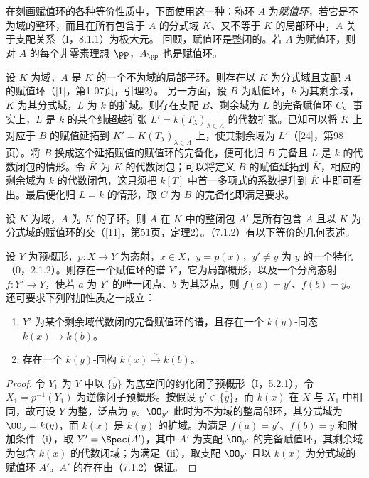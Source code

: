在刻画赋值环的各种等价性质中，下面使用这一种：称环 $A$ 为\emph{赋值环}，若它是不为域的整环，而且在所有包含于 $A$ 的分式域 $K$、又不等于 $K$ 的局部环中，$A$ 关于支配关系（I，8.1.1）为极大元。
回顾，赋值环是整闭的。若 $A$ 为赋值环，则对 $A$ 的每个非零素理想 $\pp$，$A_\pp$ 也是赋值环。

设 $K$ 为域，$A$ 是 $K$ 的一个不为域的局部子环。则存在以 $K$ 为分式域且支配 $A$ 的赋值环（[1]，第1-07页，引理2）。
另一方面，设 $B$ 为赋值环，$k$ 为其剩余域，$K$ 为其分式域，$L$ 为 $k$ 的扩域。则存在支配 $B$、剩余域为 $L$ 的完备赋值环 $C$。事实上，$L$ 是 $k$ 的某个纯超越扩张 $L'=k(T_\lambda)_{\lambda\in\Lambda}$ 的代数扩张。已知可以将 $K$ 上对应于 $B$ 的赋值延拓到 $K'=K(T_\lambda)_{\lambda\in\Lambda}$ 上，使其剩余域为 $L'$（[24]，第98页）。将 $B$ 换成这个延拓赋值的赋值环的完备化，便可化归 $B$ 完备且 $L$ 是 $k$ 的代数闭包的情形。令 $\overline K$ 为 $K$ 的代数闭包；可以将定义 $B$ 的赋值延拓到 $\overline K$，相应的剩余域为 $k$ 的代数闭包，这只须把 $k[T]$ 中首一多项式的系数提升到 $\overline K$ 中即可看出。最后便化归 $L=k$ 的情形，取 $C$ 为 $B$ 的完备化即满足要求。

设 $K$ 为域，$A$ 为 $K$ 的子环。则 $A$ 在 $K$ 中的整闭包 $A'$ 是所有包含 $A$ 且以 $K$ 为分式域的赋值环的交（[11]，第51页，定理2）。（7.1.2）有以下等价的几何表述。

设 $Y$ 为预概形，$p:X\to Y$ 为态射，$x\in X$，$y=p(x)$，$y'\ne y$ 为 $y$ 的一个特化（0，2.1.2）。则存在一个赋值环的谱 $Y'$，它为局部概形，以及一个分离态射 $f:Y'\to Y$，使若 $a$ 为 $Y'$ 的唯一闭点、$b$ 为其泛点，则 $f(a)=y'$、$f(b)=y$。还可要求下列附加性质之一成立：
\begin{enumerate}[label=\textup{(\roman*)}]
\item $Y'$ 为某个剩余域代数闭的完备赋值环的谱，且存在一个 $k(y)$-同态 $k(x)\to k(b)$。
\item 存在一个 $k(y)$-同构 $k(x)\xrightarrow{\sim}k(b)$。
\end{enumerate}
\begin{proof}
令 $Y_1$ 为 $Y$ 中以 $\overline{\{y\}}$ 为底空间的约化闭子预概形（I，5.2.1），令 $X_1=p^{-1}(Y_1)$ 为逆像闭子预概形。按假设 $y'\in\overline{\{y\}}$，而 $k(x)$ 在 $X$ 与 $X_1$ 中相同，故可设 $Y$ 为整，泛点为 $y$。$\OO_{y'}$ 此时为不为域的整局部环，其分式域为 $\OO_y=k(y)$，而 $k(x)$ 是 $k(y)$ 的扩域。为满足 $f(a)=y'$、$f(b)=y$ 和附加条件（i），取 $Y'=\Spec(A')$，其中 $A'$ 为支配 $\OO_{y'}$ 的完备赋值环，其剩余域为包含 $k(x)$ 的代数闭域；为满足（ii），取支配 $\OO_{y'}$ 且以 $k(x)$ 为分式域的赋值环 $A'$。$A'$ 的存在由（7.1.2）保证。
\end{proof}

